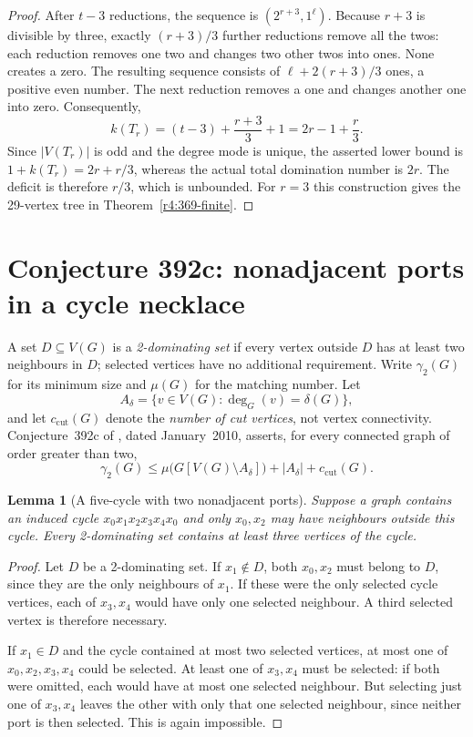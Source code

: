 \documentclass[11pt,a4paper]{article}
\newtheorem{lemma}[theorem]{Lemma}
\theoremstyle{remark}
\begin{document}
\begin{proof}
After $t-3$ reductions, the sequence is $(2^{r+3},1^\ell)$.
Because $r+3$ is divisible by three, exactly $(r+3)/3$ further reductions
remove all the twos: each reduction removes one two and changes two
other twos into ones.  None creates a zero.  The resulting sequence
consists of $\ell+2(r+3)/3$ ones, a positive even number.  The next
reduction removes a one and changes another one into zero.  Consequently,
\[
  k(T_r)=(t-3)+\frac{r+3}{3}+1
        =2r-1+\frac r3.
\]
Since $|V(T_r)|$ is odd and the degree mode is unique, the asserted lower
bound is $1+k(T_r)=2r+r/3$, whereas the actual total domination number is
$2r$.  The deficit is therefore $r/3$, which is unbounded.
For $r=3$ this construction gives the 29-vertex tree in
Theorem~\ref{r4:369-finite}.
\end{proof}

\section{Conjecture 392c: nonadjacent ports in a cycle necklace}
\label{r4:sec392c}

A set $D\subseteq V(G)$ is a \emph{2-dominating set} if every vertex
outside $D$ has at least two neighbours in $D$; selected vertices have no
additional requirement.  Write $\gamma_2(G)$ for its minimum size and
$\mu(G)$ for the matching number.  Let
\[
  A_\delta=\{v\in V(G):\deg_G(v)=\delta(G)\},
\]
and let $c_{\mathrm{cut}}(G)$ denote the \emph{number of cut vertices}, not vertex
connectivity.  Conjecture~392c of \cite{WOWII}, dated January~2010,
asserts, for every connected graph of order greater than two,
\begin{equation}
  \gamma_2(G)\le
  \mu\bigl(G[V(G)\setminus A_\delta]\bigr)
  +|A_\delta|+c_{\mathrm{cut}}(G).
  \label{r4:392c-assertion}
\end{equation}

\begin{lemma}[A five-cycle with two nonadjacent ports]
\label{r4:392c-local}
Suppose a graph contains an induced cycle
$x_0x_1x_2x_3x_4x_0$ and only $x_0,x_2$ may have neighbours outside this
cycle.  Every 2-dominating set contains at least three vertices of the
cycle.
\end{lemma}

\begin{proof}
Let $D$ be a 2-dominating set.  If $x_1\notin D$, both $x_0,x_2$ must
belong to $D$, since they are the only neighbours of $x_1$.  If these
were the only selected cycle vertices, each of $x_3,x_4$ would have only
one selected neighbour.  A third selected vertex is therefore necessary.

If $x_1\in D$ and the cycle contained at most two selected vertices,
at most one of $x_0,x_2,x_3,x_4$ could be selected.  At least one of
$x_3,x_4$ must be selected: if both were omitted, each would have at most
one selected neighbour.  But selecting just one of $x_3,x_4$ leaves the
other with only that one selected neighbour, since neither port is then
selected.  This is again impossible.
\end{proof}
\end{document}
